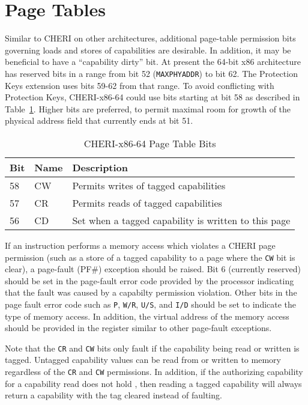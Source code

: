 \section{Page Tables}

Similar to CHERI on other architectures, additional page-table
permission bits governing loads and stores of capabilities are
desirable.  In addition, it may be beneficial to have a ``capability
dirty'' bit.  At present the 64-bit x86 architecture has reserved bits
in a range from bit 52 (\texttt{MAXPHYADDR}) to bit 62.  The Protection Keys
extension uses bits 59-62 from that range.  To avoid conflicting with
Protection Keys, CHERI-x86-64 could use bits starting at bit 58 as described in Table~\ref{table:x86:pte}.  Higher bits are
preferred, to permit maximal room for growth of the physical address
field that currently ends at bit 51.

\begin{table}
\begin{center}
\begin{tabular}{lll}
\toprule
Bit & Name & Description \\
\midrule
58 & CW & Permits writes of tagged capabilities \\
57 & CR & Permits reads of tagged capabilities \\
56 & CD & Set when a tagged capability is written to this page \\
\bottomrule
\end{tabular}
\end{center}
\caption{CHERI-x86-64 Page Table Bits}
\label{table:x86:pte}
\end{table}

If an instruction performs a memory access which violates a CHERI page
permission (such as a store of a tagged capability to a page where the
\texttt{CW} bit is clear), a page-fault (PF\#) exception should be
raised.  Bit 6 (currently reserved) should be set in the page-fault
error code provided by the processor indicating that the fault was
caused by a capabilty permission violation.  Other bits in the page
fault error code such as \texttt{P}, \texttt{W/R}, \texttt{U/S}, and
\texttt{I/D} should be set to indicate the type of memory access.  In
addition, the virtual address of the memory access should be provided
in the \CRTWO{} register similar to other page-fault exceptions.

Note that the \texttt{CR} and \texttt{CW} bits only fault if the
capability being read or written is tagged.  Untagged capability
values can be read from or written to memory regardless of the
\texttt{CR} and \texttt{CW} permissions.  In addition, if the
authorizing capability for a capability read does not hold \cappermLC,
then reading a tagged capability will always return a capability with
the tag cleared instead of faulting.

